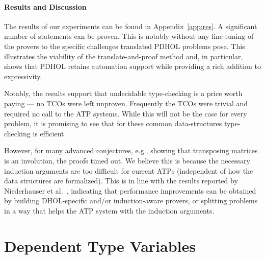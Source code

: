 \paragraph{Results and Discussion}
The results of our experiments can be found in Appendix~\ref{app:res}.
A significant number of statements can be proven. This is notably without any fine-tuning of
the provers to the specific challenges translated PDHOL problems pose. This illustrates the
viability of the translate-and-proof method and, in particular, shows that PDHOL retains
automation support while providing a rich addition to expressivity.

Notably, the results support that undecidable type-checking is a price worth paying --- no TCOs
were left unproven. Frequently the TCOs were trivial and required no call to the ATP
systems. While this will not be the case for every problem, it is promising to see that for
these common data-structures type-checking is efficient.

However, for many advanced conjectures, e.g., showing that transposing matrices is an
involution, the proofs timed out. %
We believe this is because the necessary induction arguments are too difficult for current ATPs (independent of how the data structures are formalized). 
This is in line with the results reported by Niederhauser et al.~\cite{dhol_satallax},
indicating that performance improvements can be obtained by building DHOL-specific and/or
induction-aware provers, or
splitting problems in a way that helps the ATP system with the induction arguments.


\section{Dependent Type Variables}\label{sec:dtv}

